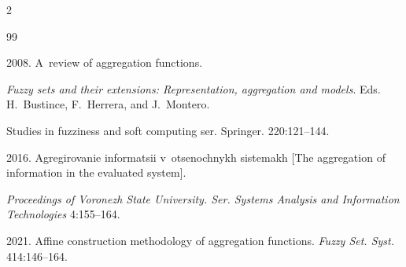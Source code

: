 








 










  \begin{multicols}{2}





\renewcommand{\bibname}{\protect\rmfamily References}







{\small\frenchspacing


 {%




 \begin{thebibliography}{99}






 2008. A~review of aggregation functions. 


 \textit{Fuzzy sets and their extensions: Representation, aggregation and models}. Eds. H.~Bustince, F.~Herrera, and J.~Montero. 


 Studies in fuzziness and soft computing ser. Springer. 220:121--144.






 2016. Agre\-gi\-ro\-va\-nie informatsii v~otsenochnykh sistemakh [The aggregation of information in the evaluated system]. 


 \textit{Proceedings of Voronezh State University. Ser. Systems Analysis and Information Technologies} 4:155--164.






 2021. Affine construction methodology of aggregation functions. \textit{Fuzzy Set. Syst.} 414:146--164.



\end{thebibliography}}}
\end{multicols}

